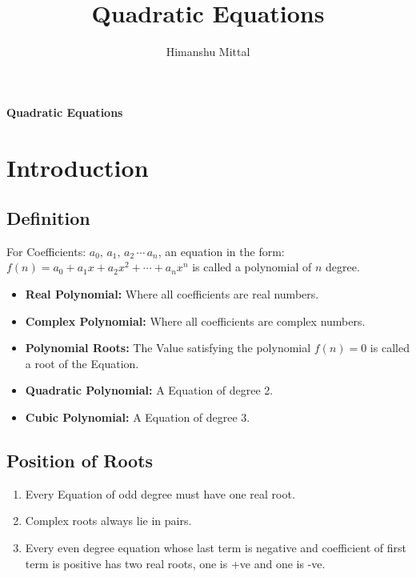 \documentclass[11pt,a4paper,landscape]{article}
\author{Himanshu Mittal}
\title{Quadratic Equations}
\begin{document}
\begin{multicols*}{3}
{\noindent \bfseries {\LARGE Quadratic Equations}}\\

\section{Introduction}
	\subsection{Definition}
	For Coefficients: $a_0,\,a_1,\,a_2\,\cdots\,a_n$, an equation in the form: $f(n) = a_0+a_1x+a_2x^2+\cdots+a_nx^n$ is called a polynomial of $n$ degree.
	\begin{itemize}
	\item \textbf{Real Polynomial:} Where all coefficients are real numbers.
	\item \textbf{Complex Polynomial:} Where all coefficients are complex numbers.
	\item \textbf{Polynomial Roots:} The Value satisfying the polynomial $f(n) = 0$ is called a root of the Equation.
	\item \textbf{Quadratic Polynomial:} A Equation of degree 2.
	\item \textbf{Cubic Polynomial:} A Equation of degree 3.
	\end{itemize}
	
	\subsection{Position of Roots}
	\renewcommand{\theenumi}{\roman{enumi}}%
	\begin{enumerate}
	\item Every Equation of odd degree must have one real root.
	\item Complex roots always lie in pairs.
	\item Every even degree equation whose last term is negative and coefficient of first term is positive has two real roots, one is +ve and one is -ve.
	\end{enumerate}
	

\end{multicols*}
\end{document}
